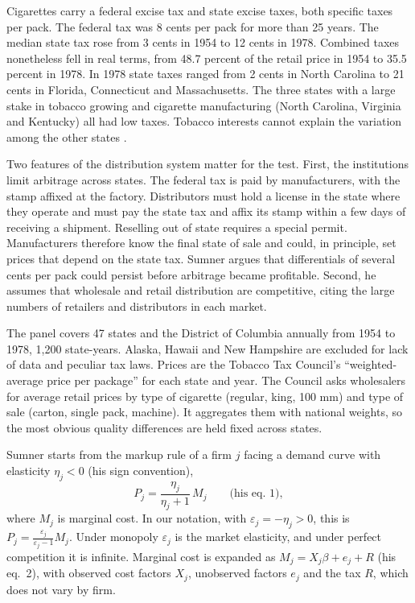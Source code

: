 Cigarettes carry a federal excise tax and state excise taxes, both specific taxes per pack. The federal tax was 8 cents
per pack for more than 25 years. The median state tax rose from 3 cents in 1954 to 12 cents in 1978. Combined taxes
nonetheless fell in real terms, from 48.7 percent of the retail price in 1954 to 35.5 percent in 1978. In 1978 state
taxes ranged from 2 cents in North Carolina to 21 cents in Florida, Connecticut and Massachusetts. The three states with
a large stake in tobacco growing and cigarette manufacturing (North Carolina, Virginia and Kentucky) all had low taxes.
Tobacco interests cannot explain the variation among the other states \citep[n.~8]{Sumner1981}.

Two features of the distribution system matter for the test. First, the institutions limit arbitrage across states.
The federal tax is paid by manufacturers, with the stamp affixed at the factory. Distributors must hold a license in the
state where they operate and must pay the state tax and affix its stamp within a few days of receiving a shipment.
Reselling out of state requires a special permit. Manufacturers therefore know the final state of sale and could, in
principle, set prices that depend on the state tax. Sumner argues that differentials of several cents per pack could
persist before arbitrage became profitable. Second, he assumes that wholesale and retail distribution are competitive,
citing the large numbers of retailers and distributors in each market.

The panel covers 47 states and the District of Columbia annually from 1954 to 1978, 1,200 state-years. Alaska, Hawaii
and New Hampshire are excluded for lack of data and peculiar tax laws. Prices are the Tobacco Tax Council's
``weighted-average price per package'' for each state and year. The Council asks wholesalers for average retail prices
by type of cigarette (regular, king, 100 mm) and type of sale (carton, single pack, machine). It aggregates them with
national weights, so the most obvious quality differences are held fixed across states.

Sumner starts from the markup rule of a firm $j$ facing a demand curve with elasticity $\eta_j < 0$ (his sign
convention),
\begin{equation*}
P_j = \frac{\eta_j}{\eta_j + 1}\, M_j \qquad \text{(his eq.~1)},
\end{equation*}
where $M_j$ is marginal cost. In our notation, with $\varepsilon_j = -\eta_j > 0$, this is
$P_j = \frac{\varepsilon_j}{\varepsilon_j - 1} M_j$. Under monopoly $\varepsilon_j$ is the market elasticity, and under
perfect competition it is infinite. Marginal cost is expanded as $M_j = X_j\beta + e_j + R$ (his eq.~2), with observed
cost factors $X_j$, unobserved factors $e_j$ and the tax $R$, which does not vary by firm.

